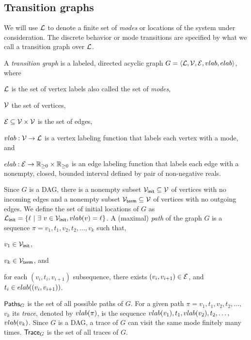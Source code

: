 \subsection{Transition graphs}
\label{ssec:modes}
We will use  ${\mathcal L}$ to denote a finite set of {\em modes\/} or locations of the system under consideration. The discrete behavior or mode transitions are specified by what we call a transition graph over ${\mathcal L}$.
\begin{definition}
	 A {\em transition graph\/} is a labeled, directed acyclic
         graph $G = \langle {\mathcal L}, {\mathcal V}, {\mathcal E}, {\sc vlab}, {\sc elab} \rangle$,
         where
	\begin{inparaenum}[(a)]
	\item ${\mathcal L}$ is the set of vertex labels also called the set of
          {\em modes\/},
	\item ${\mathcal V}$ the set of vertices, 
	\item ${\mathcal E}\subseteq {\mathcal V} \times {\mathcal V}$ is the set of edges, 
	\item ${\sc vlab}: {\mathcal V} \rightarrow {\mathcal L}$ is a vertex labeling
          function that labels each vertex with a mode, and
	\item $\edgelab: \E\rightarrow \nnreals \times \nnreals$ is an
          edge labeling function that labels each edge with a
          nonempty, closed, bounded interval defined by pair of
          non-negative reals.
	\end{inparaenum}
\end{definition}
Since $G$ is a DAG, there is a nonempty subset ${\mathcal V}_{\sf init}
\subseteq {\mathcal V}$ of vertices with no incoming edges and a nonempty subset
${\mathcal V}_{\sf term} \subseteq {\mathcal V}$ of vertices with no outgoing edges.  We
define the set of initial locations of $G$ as ${\mathcal L}_{\sf init} = \{ \ell
\ | \ \exists \ v \in {\mathcal V}_{\sf init}, {\sc vlab}(v) = \ell \}$.
% 
A (maximal) {\em path\/} of the graph $G$ is a sequence $\pi = v_1,
t_1, v_2, t_2, \ldots, v_k$ such that,
\begin{inparaenum}[(a)]
\item $v_1 \in {\mathcal V}_{\sf init}$,
\item $v_k \in {\mathcal V}_{\sf term}$, and 
\item for each $(v_i,t_i,v_{i+1})$ subsequence, there exists $(v_i, v_{i+1}) \in {\mathcal E}$, and $t_i \in {\sc elab}((v_i,v_{i+1}))$.
% 
\end{inparaenum}
%
$\paths{G}$ is the set of all possible paths of $G$.  For a given path
$\pi = v_1, t_1, v_2, t_2, \ldots,$ $v_k$ its {\em trace\/}, denoted by
${\sc vlab}(\pi)$, is the sequence ${\sc vlab}(v_1), t_1, {\sc vlab}(v_2),
t_2, \ldots,$ ${\sc vlab}(v_k)$.  Since $G$ is a DAG, a trace of $G$ can
visit the same mode finitely many times.  $\traces{G}$ is the set of
all traces of $G$.
%
%
%

